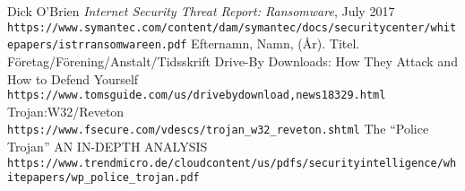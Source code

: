 \documentclass[10pt,a4paper]{article}
\begin{document}
\newpage
\begin{thebibliography}{1}
Dick O’Brien
\textit{Internet Security Threat Report: Ransomware}, July 2017
\\\texttt{https://www.symantec.com/content/dam/symantec/docs/security\-center/white\-papers/istr\-ransomware\-en.pdf}
 Efternamn, Namn, (År). Titel. Företag/Förening/Anstalt/Tidsskrift
Drive-By Downloads: How They Attack and How to Defend Yourself
\\\texttt{https://www.tomsguide.com/us/driveby\-download,news\-18329.html}
Trojan:W32/Reveton
\\\texttt{https://www.f\-secure.com/v\-descs/trojan\_w32\_reveton.shtml}
The “Police Trojan”
AN IN-DEPTH ANALYSIS
%
%
\\\texttt{https://www.trendmicro.de/cloud\-content/us/pdfs/security\-intelligence/white\-papers/wp\_police\_trojan.pdf}
\end{thebibliography}
\end{document}
